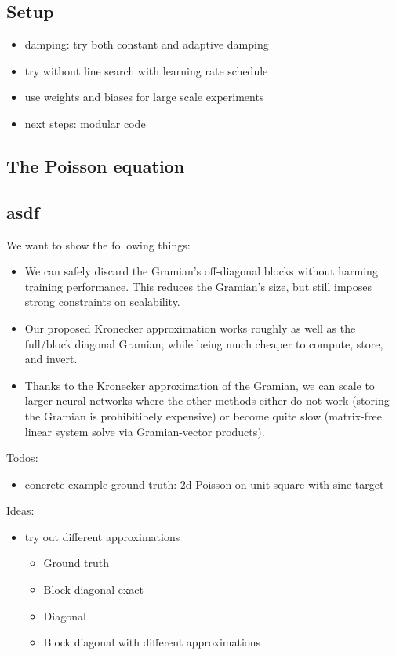 \subsection{Setup}
\begin{itemize}
    \item damping: try both constant and adaptive damping
    \item try without line search with learning rate schedule
    \item use weights and biases for large scale experiments
    \item next steps: modular code
\end{itemize}

\subsection{The Poisson equation}

\subsection{asdf}

We want to show the following things:
\begin{itemize}
\item We can safely discard the Gramian's off-diagonal blocks without harming
  training performance. This reduces the Gramian's size, but still imposes
  strong constraints on scalability.

\item Our proposed Kronecker approximation works roughly as well as the
  full/block diagonal Gramian, while being much cheaper to compute, store, and
  invert.

\item Thanks to the Kronecker approximation of the Gramian, we can scale to larger neural networks where the other methods either do not work (storing the Gramian is prohibitibely expensive) or become quite slow (matrix-free linear system solve via Gramian-vector products).
\end{itemize}

Todos:
\begin{itemize}
\item concrete example ground truth: 2d Poisson on unit square with sine target
\end{itemize}

Ideas:
\begin{itemize}
\item try out different approximations
  \begin{itemize}
  \item Ground truth
  \item Block diagonal exact
  \item Diagonal
  \item Block diagonal with different approximations
  \end{itemize}
\end{itemize}

